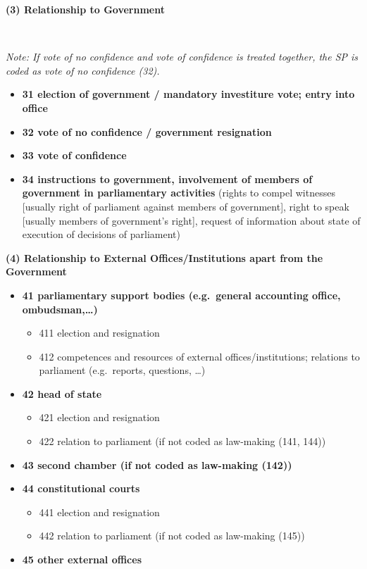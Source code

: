 \documentclass[]{article}
\providecommand{\tightlist}{%
  \setlength{\itemsep}{0pt}\setlength{\parskip}{0pt}}
\begin{document}
\textbf{(3) Relationship to Government}

~

\emph{Note: If vote of no confidence and vote of confidence is treated
together, the SP is coded as vote of no confidence (32).}

\begin{itemize}
\tightlist
\item
  \textbf{31 election of government / mandatory investiture vote; entry
  into office}
\item
  \textbf{32 vote of no confidence / government resignation}
\item
  \textbf{33 vote of confidence}
\item
  \textbf{34 instructions to government, involvement of members of
  government in parliamentary activities} (rights to compel witnesses
  {[}usually right of parliament against members of government{]}, right
  to speak {[}usually members of government's right{]}, request of
  information about state of execution of decisions of parliament)
\end{itemize}

\textbf{(4) Relationship to External Offices/Institutions apart from the
Government}

\begin{itemize}
\tightlist
\item
  \textbf{41 parliamentary support bodies (e.g.~general accounting
  office, ombudsman,\ldots{})}

  \begin{itemize}
  \tightlist
  \item
    411 election and resignation
  \item
    412 competences and resources of external offices/institutions;
    relations to parliament (e.g.~reports, questions, \ldots{})
  \end{itemize}
\item
  \textbf{42 head of state}

  \begin{itemize}
  \tightlist
  \item
    421 election and resignation
  \item
    422 relation to parliament (if not coded as law-making (141, 144))
  \end{itemize}
\item
  \textbf{43 second chamber (if not coded as law-making (142))}
\item
  \textbf{44 constitutional courts}

  \begin{itemize}
  \tightlist
  \item
    441 election and resignation
  \item
    442 relation to parliament (if not coded as law-making (145))
  \end{itemize}
\item
  \textbf{45 other external offices}
\end{itemize}
\end{document}
